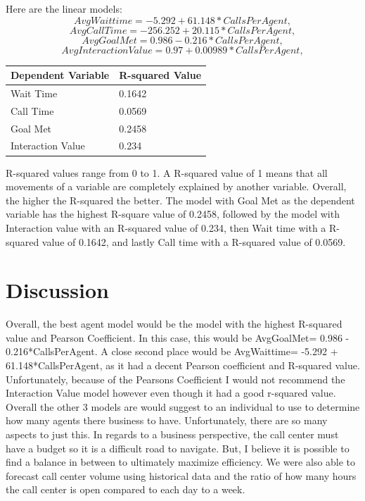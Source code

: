 \documentclass[12pt]{article}
\begin{document}
  Here are the linear models:
  \begin{equation}
    \label{eq:Wait Time}
  AvgWaittime= -5.292 + 61.148*CallsPerAgent,
  \end{equation}
  \begin{equation}
    \label{eq:Call Time}
  AvgCallTime = -256.252 + 20.115*CallsPerAgent,
  \end{equation}
  \begin{equation}
    \label{eq:Goal Met}
  AvgGoalMet= 0.986 - 0.216*CallsPerAgent,
  \end{equation}
  \begin{equation}
    \label{eq:InteractionValue}
  AvgInteractionValue= 0.97 + 0.00989*CallsPerAgent,
  \end{equation}

  \begin{table}[H]
    \resizebox{\textwidth}{!} {
    \begin{tabular}{ l | l |}
      {\bf Dependent Variable} & {\bf R-squared Value}\\
    \hline
    Wait Time& 0.1642 \\
    \hline
    Call Time& 0.0569\\
    \hline
    Goal Met& 0.2458\\
    \hline
    Interaction Value& 0.234\\
    \end{tabular}
    }
    \end{table}
R-squared values range from 0 to 1. A R-squared value of 1 means that all movements of a variable are completely explained by another variable. 
Overall, the higher the R-squared the better. The model with Goal Met as the dependent variable has the highest R-square value of 0.2458, followed by
the model with Interaction value with an R-squared value of 0.234, then Wait time with a R-squared value of 0.1642, and lastly Call time with a R-squared value of 0.0569.
\section*{Discussion}
Overall, the best agent model would be the model with the highest R-squared value and Pearson Coefficient. In this case, this would be
AvgGoalMet= 0.986 - 0.216*CallsPerAgent. A close second place would be AvgWaittime= -5.292 + 61.148*CallsPerAgent, as it had a decent 
Pearson coefficient and R-squared value. Unfortunately, because of the Pearsons Coefficient I would not recommend the Interaction Value model however even though it had a good 
r-squared value. Overall the other 3 models are would suggest to an individual to use to determine how many agents
there business to have. Unfortunately, there are so many aspects to just this. In regards to a business perspective, the call center must have
a budget so it is a difficult road to navigate. But, I believe it is possible to find a balance in between to ultimately maximize efficiency.
We were also able to forecast call center volume using historical data and the ratio of how many hours the call center is open compared to each day to
a week. 
\end{document}
